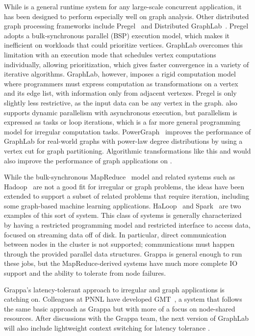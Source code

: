 \vspace{0.5ex}
While \Grappa is a general runtime system for any large-scale
concurrent application, it has been designed to perform especially
well on graph analysis. Other distributed graph processing frameworks
include Pregel~\cite{pregel:2010} and Distributed
GraphLab~\cite{distgraphlab:vldb12}. Pregel adopts a bulk-synchronous
parallel (BSP) execution model, which makes it inefficient on
workloads that could prioritize vertices. GraphLab overcomes this
limitation with an execution mode that schedules vertex computations
individually, allowing prioritization, which gives faster convergence
in a variety of iterative algorithms. GraphLab, however, imposes a
rigid computation model where programmers must express computation as
transformations on a vertex and its edge list, with information only
from adjacent vertexes. Pregel is only slightly less restrictive, as
the input data can be any vertex in the graph. \Grappa also supports
dynamic parallelism with asynchronous execution, but parallelism is
expressed as tasks or loop iterations, which is a far more general
programming model for irregular computation tasks.
PowerGraph~\cite{powergraph:osdi12} improves the performance of
GraphLab for real-world graphs with power-law degree distributions by
using a vertex cut for graph partitioning. Algorithmic transformations
like this  and would also improve the
performance of graph applications on \Grappa.

While the bulk-synchronous MapReduce~\cite{Dean:2008:MSD:1327452.1327492} model and
related systems such as Hadoop~\cite{hadoop} are not a good fit for
irregular or graph problems, the ideas have been extended to support a
subset of related problems that require iteration, including some
graph-based machine learning
applications. HaLoop~\cite{Bu:2010:HEI:1920841.1920881} and
Spark~\cite{Zaharia:2010:SCC:1863103.1863113} are two examples of this
sort of system. This class of systems is generally characterized by
having a restricted programming model and restricted interface to
access data, focused on streaming data off of disk. In particular,
direct communication between nodes in the cluster is not supported;
communications must happen through the provided parallel data
structures. Grappa is general enough to run these jobs, but the
MapReduce-derived systems have much more complete IO support and the
ability to tolerate from node failures.

Grappa's latency-tolerant approach to irregular and graph applications is
catching on. Colleagues at PNNL have developed GMT~\cite{GMT}, a system that
follows the same basic approach as Grappa but with more of a focus on
node-shared resources. After discussions with the Grappa team, the next version of GraphLab will also include
lightweight context switching for latency tolerance \cite{graphlab-next}.


